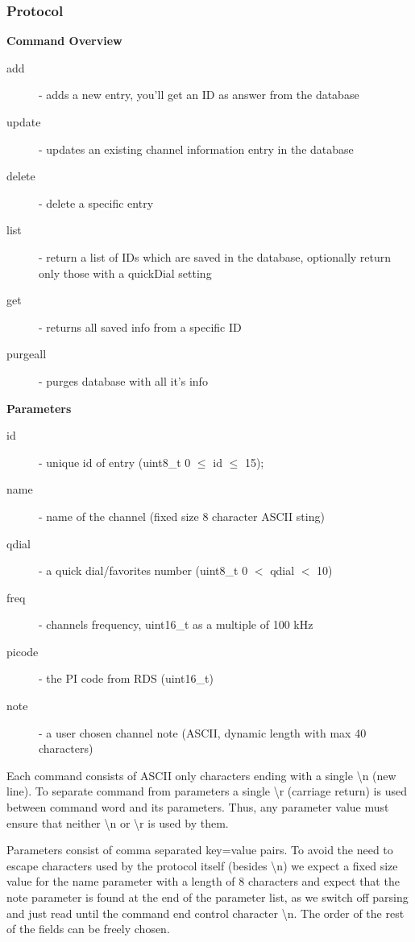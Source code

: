 \documentclass[a4paper,10pt]{article}
\renewcommand{\leq}[0]{\leqslant}
\begin{document}
\subsubsection{Protocol}

\textbf{Command Overview}
\begin{description}
\item[add]       - adds a new entry, you'll get an ID as answer from the database
\item[update]    - updates an existing channel information entry in the database
\item[delete]    - delete a specific entry
\item[list]      - return a list of IDs which are saved in the database, optionally
             return only those with a quickDial setting
\item[get]       - returns all saved info from a specific ID
\item[purgeall]  - purges database with all it's info 
\end{description}
\textbf{Parameters}
\begin{description}
\item[id]     - unique id of entry (uint8\_t 0 $\leq$ id $\leq$ 15);
\item[name]   - name of the channel (fixed size 8 character ASCII sting)
\item[qdial]  - a quick dial/favorites number (uint8\_t 0 $<$ qdial $<$ 10)
\item[freq]   - channels frequency, uint16\_t as a multiple of 100 kHz
\item[picode] - the PI code from RDS (uint16\_t)
\item[note]   - a user chosen channel note (ASCII, dynamic length with max 40 characters) 
\end{description}
Each command consists of ASCII only characters ending with a single \textbackslash n (new line).
To separate command from parameters a single \textbackslash r (carriage return) is used between
command word and its parameters. Thus, any parameter value must ensure that neither
\textbackslash n or \textbackslash r is used by them.

Parameters consist of comma separated key=value pairs. To avoid the need to escape
characters used by the protocol itself (besides \textbackslash n) we expect a fixed size value
for the name parameter with a length of 8 characters and expect that the note
parameter is found at the end of the parameter list, as we switch off parsing and
just read until the command end control character \textbackslash n.
The order of the rest of the fields can be freely chosen.
\end{document}

